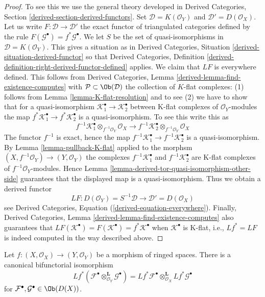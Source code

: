 \begin{proof}
To see this we use the general theory developed in
Derived Categories, Section \ref{derived-section-derived-functors}.
Set $\mathcal{D} = K(\mathcal{O}_Y)$ and $\mathcal{D}' = D(\mathcal{O}_X)$.
Let us write $F : \mathcal{D} \to \mathcal{D}'$ the exact functor
of triangulated categories defined by the rule
$F(\mathcal{G}^\bullet) = f^*\mathcal{G}^\bullet$.
We let $S$ be the set of quasi-isomorphisms in
$\mathcal{D} = K(\mathcal{O}_Y)$.
This gives a situation as in
Derived Categories, Situation \ref{derived-situation-derived-functor}
so that
Derived Categories, Definition
\ref{derived-definition-right-derived-functor-defined}
applies. We claim that $LF$ is everywhere defined.
This follows from
Derived Categories, Lemma \ref{derived-lemma-find-existence-computes}
with $\mathcal{P} \subset \Ob(\mathcal{D})$ the collection
of $K$-flat complexes: (1) follows from
Lemma \ref{lemma-K-flat-resolution}
and to see (2) we have to show that for a quasi-isomorphism
$\mathcal{K}_1^\bullet  \to \mathcal{K}_2^\bullet$ between
K-flat complexes of $\mathcal{O}_Y$-modules the map
$f^*\mathcal{K}_1^\bullet  \to f^*\mathcal{K}_2^\bullet$ is a
quasi-isomorphism. To see this write this as
$$
f^{-1}\mathcal{K}_1^\bullet \otimes_{f^{-1}\mathcal{O}_Y} \mathcal{O}_X
\longrightarrow
f^{-1}\mathcal{K}_2^\bullet \otimes_{f^{-1}\mathcal{O}_Y} \mathcal{O}_X
$$
The functor $f^{-1}$ is exact, hence the map
$f^{-1}\mathcal{K}_1^\bullet  \to f^{-1}\mathcal{K}_2^\bullet$ is a
quasi-isomorphism. By
Lemma \ref{lemma-pullback-K-flat}
applied to the morphsm $(X, f^{-1}\mathcal{O}_Y) \to (Y, \mathcal{O}_Y)$
the complexes $f^{-1}\mathcal{K}_1^\bullet$ and $f^{-1}\mathcal{K}_2^\bullet$
are K-flat complexes of $f^{-1}\mathcal{O}_Y$-modules. Hence
Lemma \ref{lemma-derived-tor-quasi-isomorphism-other-side}
guarantees that the displayed map is a quasi-isomorphism.
Thus we obtain a derived functor
$$
LF :
D(\mathcal{O}_Y) = S^{-1}\mathcal{D}
\longrightarrow
\mathcal{D}' = D(\mathcal{O}_X)
$$
see
Derived Categories, Equation (\ref{derived-equation-everywhere}).
Finally,
Derived Categories, Lemma \ref{derived-lemma-find-existence-computes}
also guarantees that
$LF(\mathcal{K}^\bullet) = F(\mathcal{K}^\bullet) = f^*\mathcal{K}^\bullet$
when $\mathcal{K}^\bullet$ is K-flat, i.e., $Lf^* = LF$ is
indeed computed in the way described above.
\end{proof}

\begin{lemma}
\label{lemma-pullback-tensor-product}
Let $f : (X, \mathcal{O}_X) \to (Y, \mathcal{O}_Y)$
be a morphism of ringed spaces. There is a canonical bifunctorial
isomorphism
$$
Lf^*(
\mathcal{F}^\bullet \otimes_{\mathcal{O}_Y}^{\mathbf{L}} \mathcal{G}^\bullet
) =
Lf^*\mathcal{F}^\bullet 
\otimes_{\mathcal{O}_X}^{\mathbf{L}}
Lf^*\mathcal{G}^\bullet 
$$
for $\mathcal{F}^\bullet, \mathcal{G}^\bullet \in \Ob(D(X))$.
\end{lemma}

